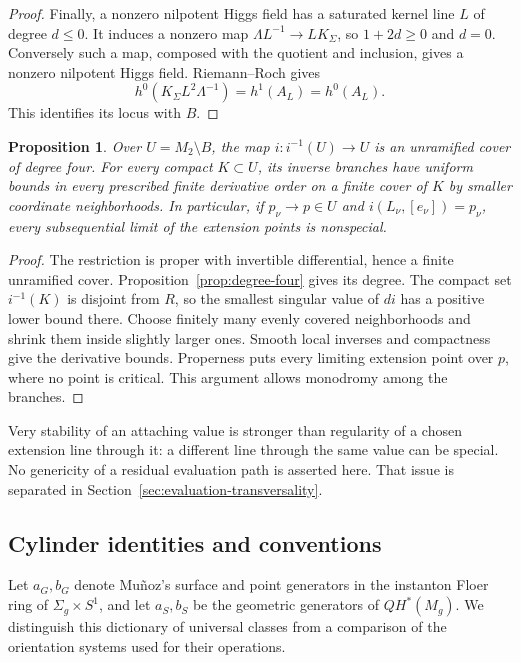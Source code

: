 \documentclass[11pt]{amsart}
\newtheorem{proposition}[theorem]{Proposition}
\theoremstyle{definition}
\theoremstyle{remark}
\theoremstyle{plain}
\begin{document}
\begin{proof}
Finally, a nonzero nilpotent Higgs field has a saturated kernel
line $L$ of degree $d\leq0$. It induces a nonzero map
$\Lambda L^{-1}\to LK_\Sigma$, so $1+2d\geq0$ and $d=0$.
Conversely such a map, composed with the quotient and inclusion,
gives a nonzero nilpotent Higgs field. Riemann--Roch gives
\[
 h^0(K_\Sigma L^2\Lambda^{-1})=h^1(A_L)=h^0(A_L).
\]
This identifies its locus with $B$.
\end{proof}

\begin{proposition}\label{prop:very-stable-branches}
Over $U=M_2\setminus B$, the map $i:i^{-1}(U)\to U$ is an
unramified cover of degree four. For every compact $K\subset U$,
its inverse branches have uniform bounds in every prescribed
finite derivative order on a finite cover of $K$ by smaller
coordinate neighborhoods. In particular, if $p_\nu\to p\in U$
and $i(L_\nu,[e_\nu])=p_\nu$, every subsequential limit of the
extension points is nonspecial.
\end{proposition}

\begin{proof}
The restriction is proper with invertible differential, hence a
finite unramified cover. Proposition~\ref{prop:degree-four} gives
its degree. The compact set $i^{-1}(K)$ is disjoint from $R$,
so the smallest singular value of $di$ has a positive lower
bound there. Choose finitely many evenly covered neighborhoods
and shrink them inside slightly larger ones. Smooth local
inverses and compactness give the derivative bounds. Properness
puts every limiting extension point over $p$, where no point
is critical. This argument allows monodromy among the branches.
\end{proof}

Very stability of an attaching value is stronger than regularity
of a chosen extension line through it: a different line through
the same value can be special. No genericity of a residual
evaluation path is asserted here. That issue is separated in
Section~\ref{sec:evaluation-transversality}.


\subsection{Cylinder identities and conventions}\label{sec:cylinder-calibration}
Let $a_G,b_G$ denote Mu\~noz's surface and
point generators in the instanton Floer ring of $\Sigma_g\times S^1$, and
let $a_S,b_S$ be the geometric generators of $QH^*(M_g)$.
We distinguish this dictionary of universal classes from a
comparison of the orientation systems used for their operations.
\end{document}
